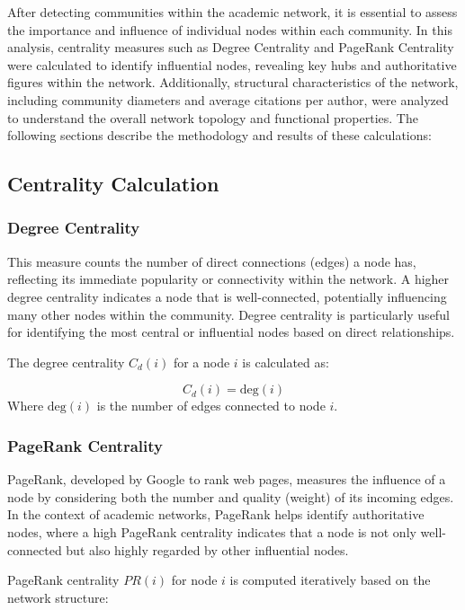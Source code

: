 \documentclass[11pt]{article}
\begin{document}
After detecting communities within the academic network, it is essential to assess the importance and influence of individual nodes within each community. In this analysis, centrality measures such as Degree Centrality and PageRank Centrality were calculated to identify influential nodes, revealing key hubs and authoritative figures within the network. Additionally, structural characteristics of the network, including community diameters and average citations per author, were analyzed to understand the overall network topology and functional properties. The following sections describe the methodology and results of these calculations:

\subsection{Centrality Calculation}

\subsubsection{Degree Centrality}

This measure counts the number of direct connections (edges) a node has, reflecting its immediate popularity or connectivity within the network. A higher degree centrality indicates a node that is well-connected, potentially influencing many other nodes within the community. Degree centrality is particularly useful for identifying the most central or influential nodes based on direct relationships.

The degree centrality \( C_d(i) \) for a node \( i \) is calculated as:

\[
	C_d(i) = \text{deg}(i)
\]
Where \( \text{deg}(i) \) is the number of edges connected to node \( i \).

\subsubsection{PageRank Centrality}

PageRank, developed by Google to rank web pages, measures the influence of a node by considering both the number and quality (weight) of its incoming edges. In the context of academic networks, PageRank helps identify authoritative nodes, where a high PageRank centrality indicates that a node is not only well-connected but also highly regarded by other influential nodes.

PageRank centrality \( PR(i) \) for node \( i \) is computed iteratively based on the network structure:
\end{document}
